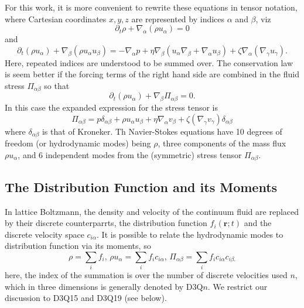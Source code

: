 For this work, it is more convenient to rewrite these equations
in tensor notation, where Cartesian coordinates ${x,y,z}$ are
represented by indices $\alpha$ and $\beta$, viz
\begin{equation}
\partial_t \rho + \nabla_\alpha (\rho u_\alpha) = 0
\end{equation}
and
\begin{equation}
\partial_t (\rho u_\alpha) + \nabla_\beta (\rho u_\alpha u_\beta)
= -\nabla_\alpha p
+  \eta \nabla_\beta (u_\alpha \nabla_\beta + \nabla_\alpha u_\beta)
+ \zeta \nabla_\alpha (\nabla_\gamma u_\gamma).
\end{equation}
Here, repeated indices are understood to be summed over.
The conservation law is seem better if the forcing terms of the
right hand side are combined in the fluid stress $\Pi_{\alpha\beta}$
so that
\begin{equation}
\partial_t (\rho u_\alpha) +\nabla_\beta \Pi_{\alpha\beta} = 0.
\end{equation}
In this case the expanded expression for the stress tensor is
\begin{equation}
\Pi_{\alpha\beta} = p \delta_{\alpha\beta} + \rho u_\alpha u_\beta 
+ \eta \nabla_\alpha v_\beta + \zeta (\nabla_\gamma v_\gamma)\delta_{\alpha\beta}
\end{equation}
where $\delta_{\alpha\beta}$ is that of Kroneker. Th Navier-Stokes
equations have 10 degrees of freedom (or hydrodynamic modes) being
$\rho$, three components of the mass flux $\rho u_\alpha$, and 6 independent
modes from the (symmetric) stress tensor $\Pi_{\alpha\beta}$.


\subsection{The Distribution Function and its Moments}

In lattice Boltzmann, the density and velocity of the continuum fluid
are replaced by their discrete counterparrts, the distribution function
$f_i(\mathbf{r}; t)$ and the discrete velocity space $c_{i\alpha}$.
It is possible to relate the hydrodynamic modes to distribution
function via its moments, so
\begin{equation}
\rho = \sum_i f_i,  \,
\rho u_\alpha = \sum_i f_i c_{i\alpha},  \,
\Pi_{\alpha\beta} = \sum_i f_i c_{i\alpha} c_{i\beta.}
\end{equation}
here, the index of the summation is over the number of discrete
velocities used $n$, which in three dimensions is generally
denoted by D3Q$n$. We restrict our discussion to D3Q15 and
D3Q19 (see below).

